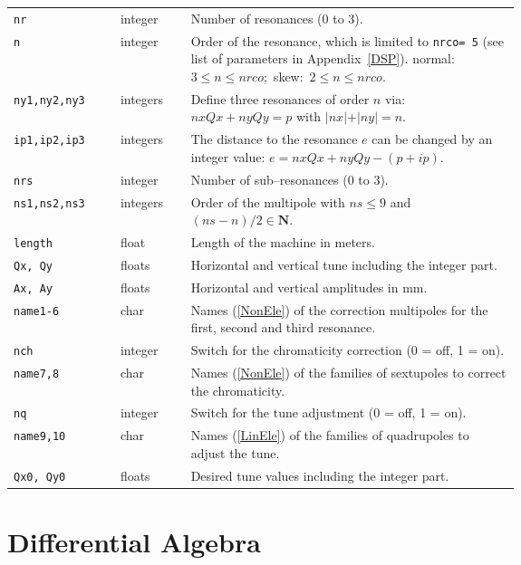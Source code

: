 \bigskip
\begin{longtabu}{@{}llp{0.65\linewidth}}
    \texttt{nr}          & integer  & Number of resonances (0 to 3). \\
    \texttt{n}           & integer  & Order of the resonance, which is limited to \texttt{nrco= 5} (see list of parameters in Appendix~\ref{DSP}). \mbox{normal: $3 \le n \le nrco$; skew: $2 \le n \le nrco$}. \\
    \texttt{ny1,ny2,ny3} & integers & Define three resonances of order $n$ via: \mbox{$nx Qx + ny Qy = p$} with \mbox{$\vert nx \vert + \vert ny \vert = n$}. \\
    \texttt{ip1,ip2,ip3} & integers & The distance to the resonance $e$ can be changed by an integer value: \mbox{$e = nx Qx + ny Qy - (p+ip)$.} \\
    \texttt{nrs}         & integer  & Number of sub--resonances (0 to 3). \\
    \texttt{ns1,ns2,ns3} & integers & Order of the multipole with \mbox{$ns \le 9$} and \mbox{$(ns-n)/2 \in {\mathbf N}$}. \\
    \texttt{length}      & float    & Length of the machine in meters. \\
    \texttt{Qx, Qy}      & floats   & Horizontal and vertical tune including the integer part. \\
    \texttt{Ax, Ay}      & floats   & Horizontal and vertical amplitudes in mm. \\
    \texttt{name1-6}     & char     & Names (\ref{NonEle}) of the correction multipoles for the first, second and third resonance. \\
    \texttt{nch}         & integer  & Switch for the chromaticity correction (0 = off, 1 = on). \\
    \texttt{name7,8}     & char     & Names (\ref{NonEle}) of the families of sextupoles to correct the chromaticity. \\
    \texttt{nq}          & integer  & Switch for the tune adjustment (0 = off, 1 = on). \\
    \texttt{name9,10}    & char     & Names (\ref{LinEle}) of the families of quadrupoles to adjust the tune. \\
    \texttt{Qx0, Qy0}    & floats   & Desired tune values including the integer part.
\end{longtabu}

\section{Differential Algebra} \label{DifAlg}

